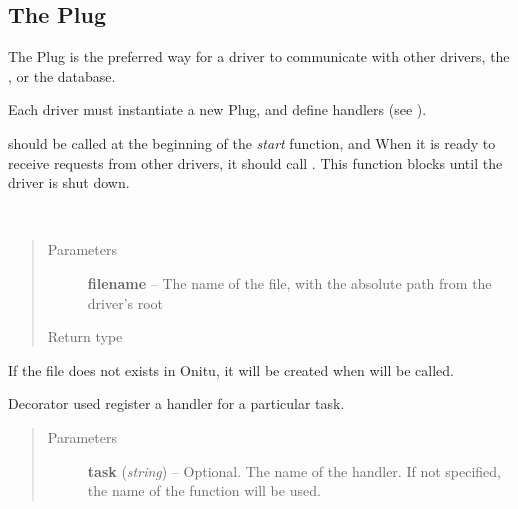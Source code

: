 \documentclass[letterpaper,10pt,english]{sphinxmanual}
\begin{document}
\subsection{The Plug}
\label{drivers:the-plug}

\begin{fulllineitems}
\label{drivers:onitu.api.Plug}
The Plug is the preferred way for a driver to communicate
with other drivers, the {\hyperref[components:onitu.referee.Referee]{}}, or
the database.

Each driver must instantiate a new Plug, and define handlers
(see {\hyperref[drivers:onitu.api.Plug.handler]{}}).

{\hyperref[drivers:onitu.api.Plug.initialize]{}} should be called at the beginning of the
\emph{start} function, and
When it is ready to receive requests from other drivers,
it should call {\hyperref[components:onitu.referee.Referee.listen]{}}. This function blocks until
the driver is shut down.

\begin{fulllineitems}
\label{drivers:onitu.api.Plug.get_metadata}~\begin{quote}\begin{description}
\item[{Parameters}] \leavevmode
\textbf{filename} -- The name of the file, with the absolute path
from the driver's root

\item[{Return type}] \leavevmode
{\hyperref[drivers:onitu.api.metadata.Metadata]{}}

\end{description}\end{quote}

If the file does not exists in Onitu, it will be created when
{\hyperref[drivers:onitu.api.metadata.Metadata.write]{}} will be called.

\end{fulllineitems}


\begin{fulllineitems}
\label{drivers:onitu.api.Plug.handler}
Decorator used register a handler for a particular task.
\begin{quote}\begin{description}
\item[{Parameters}] \leavevmode
\textbf{task} (\emph{string}) -- Optional. The name of the handler. If not
specified, the name of the function will be used.


\end{description}
\end{quote}
\end{fulllineitems}
\end{fulllineitems}
\end{document}
